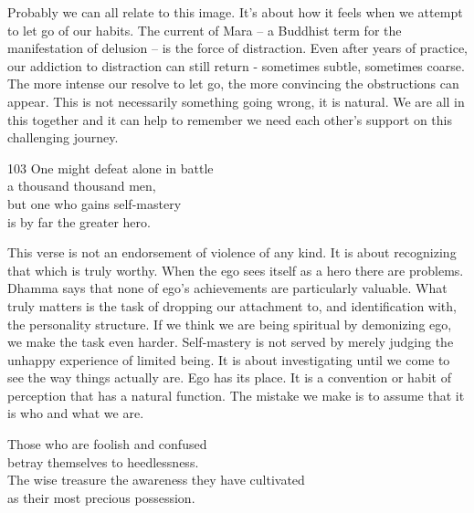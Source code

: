 \begin{dhpRefl}
Probably we can all relate to this image. It's about how it feels when we attempt to let go of our habits. The current of Mara – a Buddhist term for the manifestation of delusion –  is the force of distraction. Even after years of practice, our addiction to distraction can still return - sometimes subtle, sometimes coarse. The more intense our resolve to let go, the more convincing the obstructions can appear. This is not necessarily something going wrong, it is natural. We are all in this together and it can help to remember we need each other's support on this challenging journey.
\end{dhpRefl}


\begin{dhpVerse}{103}
\label{dhp-103}
One might defeat alone in battle\\
a thousand thousand men,\\
but one who gains self-mastery\\
is by far the greater hero.
\end{dhpVerse}

\begin{dhpRefl}
This verse is not an endorsement of violence of any kind. It is about recognizing that which is truly worthy. When the ego sees itself as a hero there are problems. Dhamma says that none of ego's achievements are particularly valuable. What truly matters is the task of dropping our attachment to, and identification with, the personality structure. If we think we are being spiritual by demonizing ego, we make the task even harder. Self-mastery is not served by merely judging the unhappy experience of limited being. It is about investigating until we come to see the way things actually are. Ego has its place. It is a convention or habit of perception that has a natural function. The mistake we make is to assume that it is who and what we are.
\end{dhpRefl}


\begin{dhpVerse}{26}
\label{dhp-26}
Those who are foolish and confused\\
betray themselves to heedlessness.\\
The wise treasure the awareness they have cultivated\\
as their most precious possession.
\end{dhpVerse}

